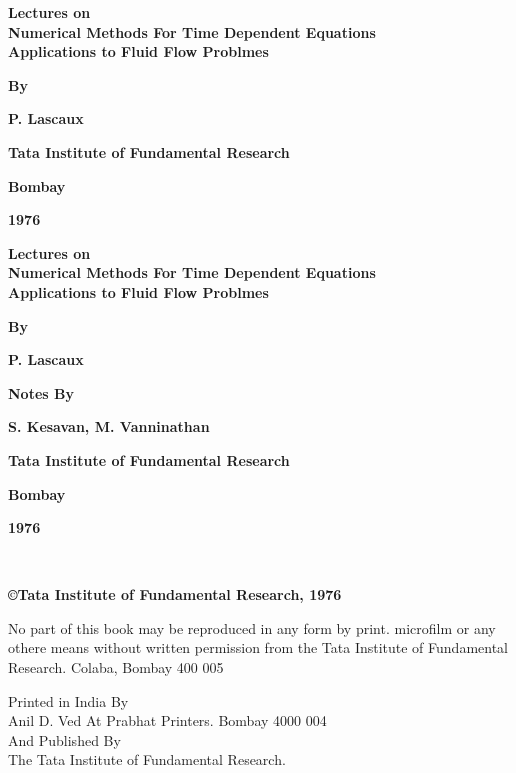 \thispagestyle{empty}

\begin{center}
\textbf{Lectures on}\\[5pt] 
\textbf{Numerical Methods For Time Dependent Equations}\\[5pt]
\textbf{Applications to Fluid Flow Problmes}
\vfill

{\bf By}
\medskip

{\large\bf P. Lascaux}
\vfill


{\bf Tata Institute of Fundamental Research}

{\bf Bombay}

{\bf 1976}
\end{center}

\eject

\thispagestyle{empty}

\begin{center}
\textbf{Lectures on}\\[5pt] 
\textbf{Numerical Methods For Time Dependent Equations}\\[5pt]
\textbf{Applications to Fluid Flow Problmes}
\vfill

{\bf By}
\medskip

{\large\bf P. Lascaux}
\vfill





{\bf Notes By}
\medskip

{\large\bf S. Kesavan, M. Vanninathan}
\vfill

{\bf Tata Institute of Fundamental Research}

{\bf Bombay}

{\bf 1976}
\end{center}

\eject

\thispagestyle{empty}
~\vfill

\begin{center}

{\bf\copyright  Tata Institute of Fundamental Research, 1976}
\vskip 1cm

\parbox{0.7\textwidth}{No part of this book may be reproduced in any form by print.
  microfilm or any othere means without written permission from the
  Tata Institute of Fundamental Research. Colaba, Bombay 400 005}
\vfill

Printed in India By\\
Anil D. Ved At Prabhat Printers. Bombay 4000 004\\[10pt]
And Published By\\
The Tata Institute of Fundamental Research.
\end{center}



